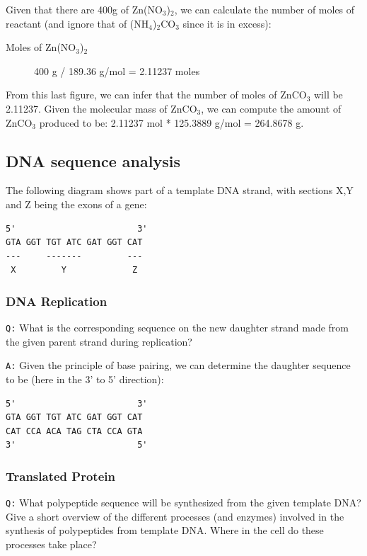 \documentclass[11pt, a4paper,titlepage]{article}
\begin{document}
Given that there are 400g of Zn(NO$_{3}$)$_{2}$, we can calculate the
number of moles of reactant (and ignore that of (NH$_{4}$)$_{2}$CO$_{3}$
since it is in excess):

\begin{description}
\item[Moles of Zn(NO$_{3}$)$_{2}$] 400 g / 189.36 g/mol = 2.11237 moles
\end{description}

From this last figure, we can infer that the number of moles of
ZnCO$_{3}$ will be 2.11237. Given the molecular mass of ZnCO$_{3}$, we can
compute the amount of ZnCO$_{3}$ produced to be: 2.11237 mol * 125.3889
g/mol = 264.8678 g.
\subsection{DNA sequence analysis}
\label{sec-1-2}


The following diagram shows part of a template DNA strand, with
sections X,Y and Z being the exons of a gene:


\begin{verbatim}
5'                        3'
GTA GGT TGT ATC GAT GGT CAT
---     -------         ---
 X         Y             Z
\end{verbatim}
\subsubsection{DNA Replication}
\label{sec-1-2-1}

\texttt{Q:} What is the corresponding sequence on the new daughter strand
made from the given parent strand during replication?

\texttt{A:} Given the principle of base pairing, we can determine the daughter
sequence to be (here in the 3' to 5' direction):


\begin{verbatim}
5'                        3'
GTA GGT TGT ATC GAT GGT CAT
CAT CCA ACA TAG CTA CCA GTA
3'                        5'
\end{verbatim}
\subsubsection{Translated Protein}
\label{sec-1-2-2}

\texttt{Q:} What polypeptide sequence will be synthesized from the given template
DNA? Give a short overview of the different processes (and enzymes)
involved in the synthesis of polypeptides from template DNA. Where in
the cell do these processes take place?
\end{document}
